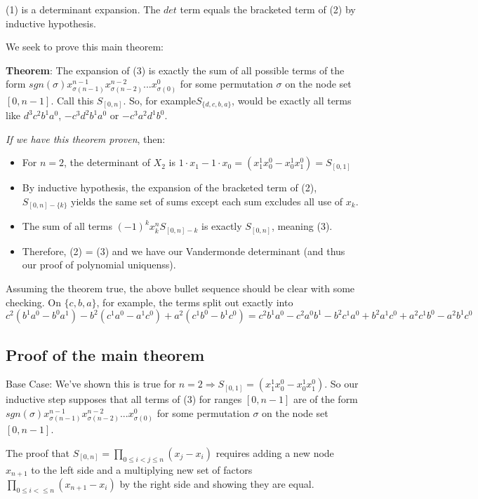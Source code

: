 \documentclass[11pt, oneside]{article} 	%
\begin{document}
(1) is a determinant expansion.  The $det$ term equals the bracketed term of (2) by inductive hypothesis.

We seek to prove this main theorem:

\textbf{Theorem}: The expansion of (3) is exactly the sum of all possible terms of the form $sgn(\sigma) x_{\sigma(n-1)}^{n-1} x_{\sigma(n-2)}^{n-2} ... x_{\sigma(0)}^{0} $ for some permutation $\sigma$ on the node set $[0, n-1]$.  Call this $S_{[0,n]}$.  So, for example$S_{\{d,c,b,a\}}$, would be exactly all terms like $d^3c^2b^1a^0$, $-c^3d^2b^1a^0$ or $-c^3a^2d^1b^0$.

\emph{If we have this theorem proven}, then:

\begin{itemize}
\item For $n=2$, the determinant of $X_2$ is $1\cdot x_1 - 1 \cdot x_0 = (x_1^1x_0^0 - x_0^1x_1^0) = S_{[0,1]}$
\item By inductive hypothesis, the expansion of the bracketed term of (2), $S_{[0,n]-\{k\}}$ yields the same set of sums except each sum excludes all use of $x_k$.
\item The sum of all terms $(-1)^kx_k^nS_{[0,n]-{k}}$ is exactly $S_{[0,n]}$, meaning (3).
\item Therefore, (2) = (3) and we have our Vandermonde determinant (and thus  our proof of polynomial uniquenss).
\end{itemize}

Assuming the theorem true, the above bullet sequence should be clear with some checking.  On  $\{c,b,a\}$, for example, the terms split out exactly into $c^2(b^1a^0 - b^0a^1) - b^2(c^1a^0-a^1c^0) + a^2(c^1b^0-b^1c^0) = c^2b^1a^0 - c^2a^0b^1 - b^2c^1a^0 + b^2a^1c^0 + a^2c^1b^0 - a^2b^1c^0$


\subsection{Proof of the main theorem}

Base Case: We've shown this is true for  $n=2 \Rightarrow S_{[0,1]} = (x_1^1x_0^0 - x_0^1x_1^0)$.  
So our inductive step supposes that all terms of (3) for ranges $[0, n-1]$ are of the form  $sgn(\sigma) x_{\sigma(n-1)}^{n-1} x_{\sigma(n-2)}^{n-2} ... x_{\sigma(0)}^{0} $ for some permutation $\sigma$ on the node set $[0, n-1]$.  

The proof that  $S_[0,n] = \prod_{0 \leq i < j \leq n} (x_j - x_i)$ requires adding a new node $x_{n+1}$ to the left side and a multiplying new set of factors $\prod_{0 \leq i < \leq n} (x_{n+1} - x_i)$ by the right side and showing they are equal.
\end{document}
